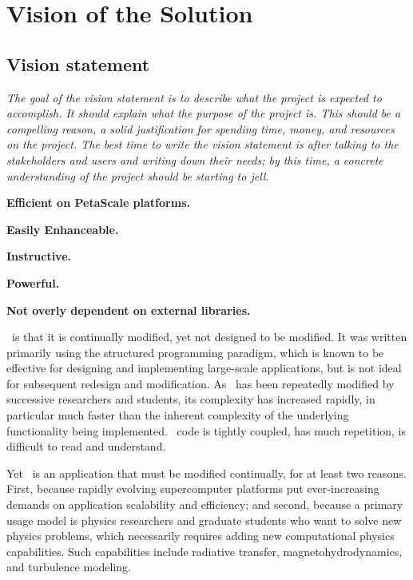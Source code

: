 \documentclass[12pt]{article}
\begin{document}
\section{Vision of the Solution}

\subsection{Vision statement}

    \textit{The goal of the vision statement is to describe what the project
    is expected to accomplish. It should explain what the purpose of
    the project is. This should be a compelling reason, a solid
    justification for spending time, money, and resources on the
    project. The best time to write the vision statement is after
    talking to the stakeholders and users and writing down their
    needs; by this time, a concrete understanding of the project
    should be starting to jell.}

    \textbf{Efficient on PetaScale platforms.}

    \textbf{Easily Enhanceable.}

    \textbf{Instructive.}  

    \textbf{Powerful.}

    \textbf{Not overly dependent on external libraries.}

    \enzo\ is that it is continually modified, yet not designed to be
    modified.  It was written primarily using the structured
    programming paradigm, which is known to be effective for designing
    and implementing large-scale applications, but is not ideal for
    subsequent redesign and modification.  As \enzo\ has been
    repeatedly modified by successive researchers and students, its
    complexity has increased rapidly, in particular much faster than
    the inherent complexity of the underlying functionality being
    implemented.
%
    \enzo\ code is tightly coupled, has much repetition, is difficult
    to read and understand.

    Yet \enzo\ is an application that must be modified continually,
    for at least two reasons.  First, because rapidly evolving
    supercomputer platforms put ever-increasing demands on application
    scalability and efficiency; and second, because a primary usage
    model is physics researchers and graduate students who want to
    solve new physics problems, which necessarily requires adding new
    computational physics capabilities.  Such capabilities include
    radiative transfer, magnetohydrodynamics, and turbulence modeling.
\end{document}
